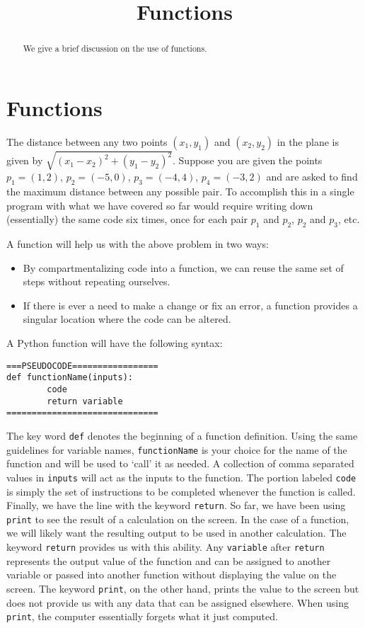 \documentclass{ximera}
\title{Functions}
\begin{document}
  
\begin{abstract}  
We give a brief discussion on the use of functions.
\end{abstract}  
\maketitle

\section{Functions}

The distance between any two points $(x_1,y_1)$ and $(x_2,y_2)$ in the plane is given by $\sqrt{(x_1-x_2)^2+(y_1-y_2)^2}.$ Suppose you are given the points $p_1=(1,2)$, $p_2=(-5,0)$, $p_3=(-4,4)$, $p_4=(-3,2)$ and are asked to find the maximum distance between any possible pair. To accomplish this in a single program with what we have covered so far would require writing down (essentially) the same code six times, once for each pair $p_1$ and $p_2$, $p_2$ and $p_3$, etc. 

A function will help us with the above problem in two ways:

\begin{itemize}
	\item By compartmentalizing code into a function, we can reuse the same set of steps without repeating ourselves.
	\item If there is ever a need to make a change or fix an error, a function provides a singular location where the code can be altered.
\end{itemize}

A Python function will have the following syntax:

\begin{verbatim}
===PSEUDOCODE=================
def functionName(inputs):
        code
        return variable
==============================
\end{verbatim}

The key word \verb|def| denotes the beginning of a function definition. Using the same guidelines for variable names, \verb|functionName| is your choice for the name of the function and will be used to `call' it as needed. A collection of comma separated values in \verb|inputs| will act as the inputs to the function.  The portion labeled \verb|code| is simply the set of instructions to be completed whenever the function is called. Finally, we have the line with the keyword \verb|return|. So far, we have been using \verb|print| to see the result of a calculation on the screen. In the case of a function, we will likely want the resulting output to be used in another calculation. The keyword \verb|return| provides us with this ability. Any \verb|variable| after \verb|return| represents the output value of the function and can be assigned to another variable or passed into another function without displaying the value on the screen. The keyword \verb|print|, on the other hand, prints the value to the screen but does not provide us with any data that can be assigned elsewhere. When using \verb|print|, the computer essentially forgets what it just computed.
\end{document}

